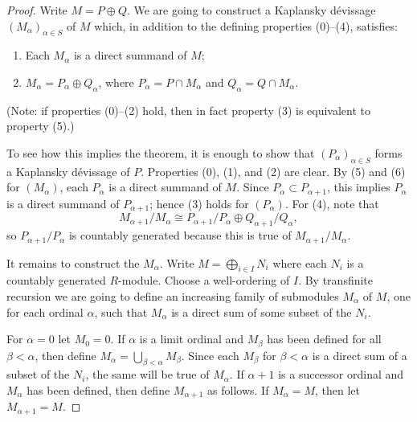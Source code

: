 \documentclass[UTF8,11pt]{ctexart}
\theoremstyle{definition}
\begin{document}
\begin{proof}
Write $M=P\oplus Q$. We are going to construct a Kaplansky d\'evissage $(M_\alpha)_{\alpha\in S}$ of $M$ which, in addition to the defining properties (0)--(4), satisfies:
\begin{enumerate}[label=(\arabic*),start=5]
\item Each $M_\alpha$ is a direct summand of $M$;
\item $M_\alpha=P_\alpha\oplus Q_\alpha$, where $P_\alpha=P\cap M_\alpha$ and $Q_\alpha=Q\cap M_\alpha$.
\end{enumerate}
(Note: if properties (0)--(2) hold, then in fact property (3) is equivalent to property (5).)

To see how this implies the theorem, it is enough to show that $(P_\alpha)_{\alpha\in S}$ forms a Kaplansky d\'evissage of $P$. Properties (0), (1), and (2) are clear. By (5) and (6) for $(M_\alpha)$, each $P_\alpha$ is a direct summand of $M$. Since $P_\alpha\subset P_{\alpha+1}$, this implies $P_\alpha$ is a direct summand of $P_{\alpha+1}$; hence (3) holds for $(P_\alpha)$. For (4), note that
\[M_{\alpha+1}/M_\alpha\cong P_{\alpha+1}/P_\alpha\oplus Q_{\alpha+1}/Q_\alpha,\]
so $P_{\alpha+1}/P_\alpha$ is countably generated because this is true of $M_{\alpha+1}/M_\alpha$.

It remains to construct the $M_\alpha$. Write $M=\bigoplus_{i\in I}N_i$ where each $N_i$ is a countably generated $R$-module. Choose a well-ordering of $I$. By transfinite recursion we are going to define an increasing family of submodules $M_\alpha$ of $M$, one for each ordinal $\alpha$, such that $M_\alpha$ is a direct sum of some subset of the $N_i$.

For $\alpha=0$ let $M_0=0$. If $\alpha$ is a limit ordinal and $M_\beta$ has been defined for all $\beta<\alpha$, then define $M_\alpha=\bigcup_{\beta<\alpha}M_\beta$. Since each $M_\beta$ for $\beta<\alpha$ is a direct sum of a subset of the $N_i$, the same will be true of $M_\alpha$. If $\alpha+1$ is a successor ordinal and $M_\alpha$ has been defined, then define $M_{\alpha+1}$ as follows. If $M_\alpha=M$, then let $M_{\alpha+1}=M$.


\end{proof}
\end{document}
